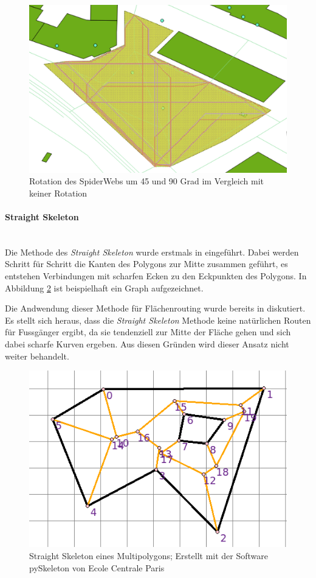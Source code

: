 \begin{figure}[th]
\centering
\includegraphics[width=0.7\linewidth]{technicalreport/img/rotation_comparison}
\caption[SpiderWeb-Graph Vergleich mit Rotation]{Rotation des SpiderWebs um 45 und 90 Grad im Vergleich mit keiner Rotation}
\label{fig:rotation_comparison}
\end{figure}

\paragraph{Straight Skeleton}~\\
Die Methode des \emph{Straight Skeleton} wurde erstmals in \cite{aichholzer_skeleton} eingeführt. Dabei werden Schritt für Schritt die Kanten des Polygons zur Mitte zusammen geführt, es entstehen Verbindungen mit scharfen Ecken zu den Eckpunkten des Polygons. In Abbildung \ref{fig:skeleton_example} ist beispielhaft ein Graph aufgezeichnet.

Die Andwendung dieser Methode für Flächenrouting wurde bereits in \cite{graser_visibility_graph} diskutiert. Es stellt sich heraus, dass die \emph{Straight Skeleton} Methode keine natürlichen Routen für Fussgänger ergibt, da sie tendenziell zur Mitte der Fläche gehen und sich dabei scharfe Kurven ergeben. Aus diesen Gründen wird dieser Ansatz nicht weiter behandelt.

\begin{figure}[th]
\centering
\includegraphics[width=0.7\linewidth]{technicalreport/img/skeleton_example.png}
\caption[Straight Skeleton Beispiel]{Straight Skeleton eines Multipolygons; Erstellt mit der Software pySkeleton von Ecole Centrale Paris}
\label{fig:skeleton_example}
\end{figure}


